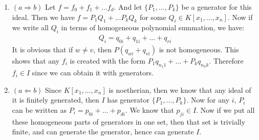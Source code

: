 \begin{enumerate}[label=]
    \item $(a \Rightarrow b)$
        Let $f = f_0 + f_1 + \dots f_d$. And let $\{P_1, \dots, P_k\}$ be a generator for this ideal. Then we have $f = P_1 Q_1 + \dots P_k Q_k$ for some $Q_i \in K[x_1, \dots, x_n]$. Now if we write all $Q_i$ in terms of homogeneous polynomial summation, we have:
        \begin{gather*}
            Q_i = q_{0i} + q_{1i} + \dots + q_{ri}
        \end{gather*}
        It is obvious that if $w \ne v$, then $P (q_{wi} + q_{vi})$ is not homogeneous. This shows that any $f_i$ is created with the form $P_1 q_{n_1 1} + \dots + P_k q_{n_k k}$. Therefore $f_i \in I$ since we can obtain it with generators.
    \item $(a \Leftarrow b)$
        Since $K[x_1, \dots, x_n]$ is noetherian, then we know that any ideal of it is finitely generated, then $I$ has generator $\{P_1, \dots, P_k\}$. Now for any $i$, $P_i$ can be written as $P_i = p_{0i} + \dots + p_{di}$. We know that $p_{ji} \in I$. Now if we put all these homogeneous parts of generators in one set, then that set is trivially finite, and can generate the generator, hence can generate $I$.
\end{enumerate}